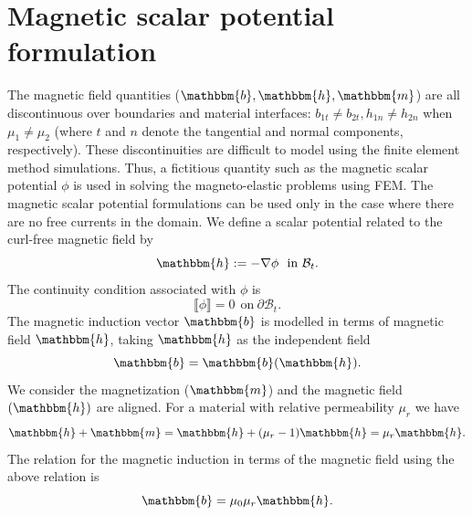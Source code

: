 \documentclass[11pt,a4paper,final]{article}
\begin{document}
\section{Magnetic scalar potential formulation}
The magnetic field quantities ($\mathbbm{b}, \mathbbm{h}, \mathbbm{m}$) are all discontinuous over boundaries and material interfaces: $b_{1t} \neq b_{2t}, h_{1n} \neq h_{2n}$ when $\mu_1 \neq \mu_2$ (where $t$ and $n$ denote the tangential and normal components, respectively). These discontinuities are difficult to model using the finite element method simulations. Thus, a fictitious quantity such as the magnetic scalar potential $\phi$ is used in solving the magneto-elastic problems using FEM. The magnetic scalar potential formulations can be used only in the case where there are no free currents in the domain. We define a scalar potential related to the curl-free magnetic field by \cite{pelteret2016}
\begin{equation}
\mathbbm{h} := -\nabla \phi \ \ \text{in} \ \mathcal{B}_t. 
\label{eq:1.5}
\end{equation}
The continuity condition associated with $\phi$ is 
\begin{equation}
\llbracket \phi \rrbracket = 0 \ \ \text{on} \ \partial\mathcal{B}_t.
\end{equation}
The magnetic induction vector $\mathbbm{b}$ is modelled in terms of magnetic field $\mathbbm{h}$, taking $\mathbbm{h}$ as the independent field
\begin{equation}
\mathbbm{b} = \mathbbm{b}(\mathbbm{h}).
\end{equation}
We consider the magnetization ($\mathbbm{m}$) and the magnetic field $(\mathbbm{h})$ are aligned. For a material with relative permeability $\mu_r$ we have
\begin{equation}
\mathbbm{h} + \mathbbm{m} = \mathbbm{h} + (\mu_r - 1)\mathbbm{h} = \mu_r \mathbbm{h}.
\end{equation}
The relation for the magnetic induction in terms of the magnetic field using the above relation is
\begin{equation}
\mathbbm{b} = \mu_0 \mu_r \mathbbm{h}.
\label{eq:1.7}
\end{equation}
\end{document}
